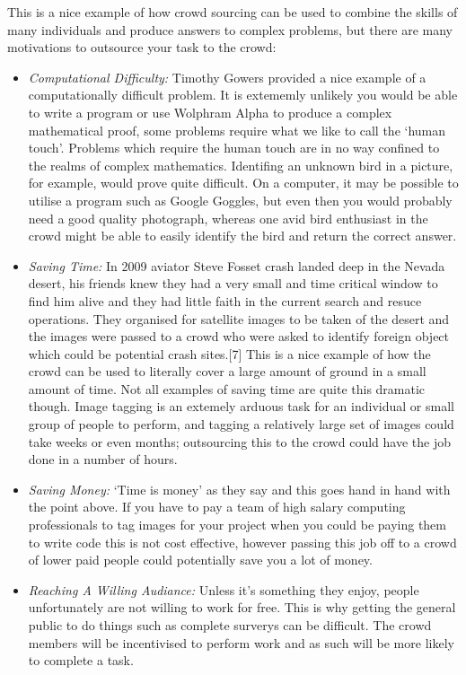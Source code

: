 \documentclass[11pt]{article}
\begin{document}
This is a nice example of how crowd sourcing can be used to combine the skills of many individuals and produce answers to complex problems,
but there are many motivations to outsource your task to the crowd:
\begin{itemize}
\item
\emph{Computational Difficulty:} Timothy Gowers provided a nice example of a computationally difficult problem. It is extememly unlikely you
would be able to write a program or use Wolphram Alpha to produce a complex mathematical proof, some problems require what we like to call
the `human touch'. Problems which require the human touch are in no way confined to the realms of complex mathematics. Identifing an unknown
bird in a picture, for example, would prove quite difficult. On a computer, it may be possible to utilise a program such as Google Goggles, but even then you 
would probably need a good quality photograph, whereas one avid bird enthusiast in the crowd might be able to easily identify the bird and
return the correct answer.
\item
\emph{Saving Time:} In 2009 aviator Steve Fosset crash landed deep in the Nevada desert, his friends knew they had a very small
and time critical window to find him alive and they had little faith in the current search and resuce operations. They organised for satellite 
images to be taken of the desert and the images were passed to a crowd who were asked to identify foreign object which could be potential crash 
sites.[7] This is a nice example of how the crowd can be used to literally cover a large amount of ground in a small amount of time. Not all 
examples of saving time are quite this dramatic though. Image tagging is an extemely arduous task for an individual or small group of people 
to perform, and tagging a relatively large set of images could take weeks or even months; outsourcing this to the crowd could have the job 
done in a number of hours.
\item
\emph{Saving Money:} `Time is money' as they say and this goes hand in hand with the point above. If you have to pay a team of high salary computing
professionals to tag images for your project when you could be paying them to write code this is not cost effective, however passing this job off
to a crowd of lower paid people could potentially save you a lot of money. 
\item
\emph{Reaching A Willing Audiance:} Unless it's something they enjoy, people unfortunately are not willing to work for free. This is why
getting the general public to do things such as complete surverys can be difficult. The
crowd members will be incentivised to perform work and as such will be more likely to complete a task.
\end{itemize}
\end{document}
